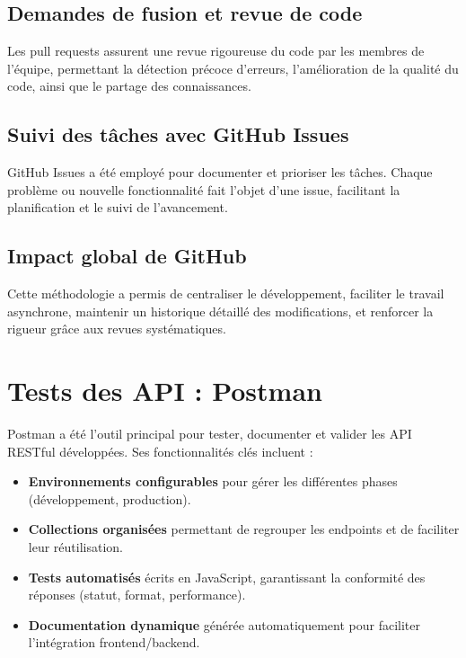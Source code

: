\documentclass[12pt]{rapportPfe}
\begin{document}
\subsection{Demandes de fusion et revue de code}

Les pull requests assurent une revue rigoureuse du code par les membres de l’équipe, permettant la détection précoce d’erreurs, l’amélioration de la qualité du code, ainsi que le partage des connaissances.

\subsection{Suivi des tâches avec GitHub Issues}

GitHub Issues a été employé pour documenter et prioriser les tâches. Chaque problème ou nouvelle fonctionnalité fait l’objet d’une issue, facilitant la planification et le suivi de l’avancement.

\subsection{Impact global de GitHub}

Cette méthodologie a permis de centraliser le développement, faciliter le travail asynchrone, maintenir un historique détaillé des modifications, et renforcer la rigueur grâce aux revues systématiques.

\section{Tests des API : Postman}

Postman a été l’outil principal pour tester, documenter et valider les API RESTful développées. Ses fonctionnalités clés incluent :

\begin{itemize}
    \item \textbf{Environnements configurables} pour gérer les différentes phases (développement, production).
    \item \textbf{Collections organisées} permettant de regrouper les endpoints et de faciliter leur réutilisation.
    \item \textbf{Tests automatisés} écrits en JavaScript, garantissant la conformité des réponses (statut, format, performance).
    \item \textbf{Documentation dynamique} générée automatiquement pour faciliter l’intégration frontend/backend.
\end{itemize}
\end{document}
